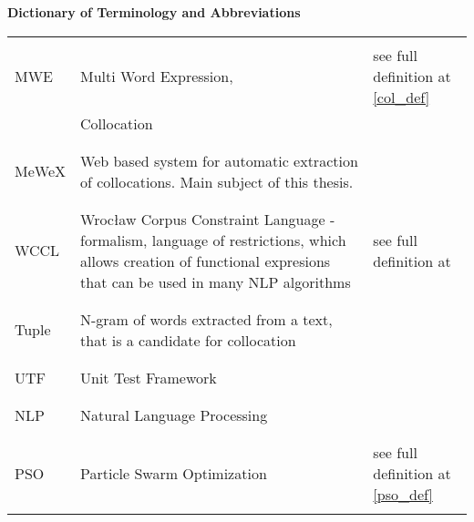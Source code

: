 \textbf{\LARGE Dictionary of Terminology and Abbreviations}

\vspace{1cm}

{\centering
\begin{tabular*}{\textwidth}{L{0.2\textwidth} L{0.5\textwidth} L{0.25\textwidth}}%
    \hline \\
    MWE & Multi Word Expression, & see full definition at \ref{col_def}\\
        & Collocation &  \\
    \\ \hline \\
    MeWeX & Web based system for automatic extraction of collocations. Main subject of this thesis. \\
    \\ \hline \\
    WCCL & Wrocław Corpus Constraint Language - formalism, language of restrictions, which allows creation of 
    functional expresions that can be used in many NLP algorithms & see full definition at \cite{wccl}\\
    \\ \hline \\
    Tuple & N-gram of words extracted from a text, that is a candidate for collocation \\
    \\ \hline \\
    UTF & Unit Test Framework \\
    \\ \hline \\
    NLP & Natural Language Processing \\
    \\ \hline \\
    PSO & Particle Swarm Optimization & see full definition at \ref{pso_def}\\
    \\\hline
\end{tabular*} }
    